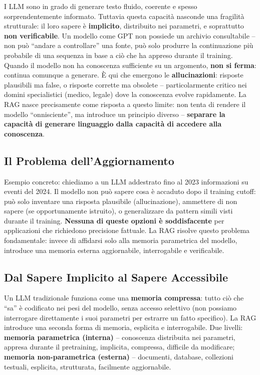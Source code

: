 \documentclass[12pt,a4paper]{article}
\begin{document}
I LLM sono in grado di generare testo fluido, coerente e spesso sorprendentemente informato. Tuttavia questa capacit\`a nasconde una fragilit\`a strutturale: il loro sapere \`e \textbf{implicito}, distribuito nei parametri, e soprattutto \textbf{non verificabile}. Un modello come GPT non possiede un archivio consultabile -- non pu\`o ``andare a controllare'' una fonte, pu\`o solo produrre la continuazione pi\`u probabile di una sequenza in base a ci\`o che ha appreso durante il training. Quando il modello non ha conoscenza sufficiente su un argomento, \textbf{non si ferma}: continua comunque a generare. \`E qui che emergono le \textbf{allucinazioni}: risposte plausibili ma false, o risposte corrette ma obsolete -- particolarmente critico nei domini specialistici (medico, legale) dove la conoscenza evolve rapidamente. La RAG nasce precisamente come risposta a questo limite: non tenta di rendere il modello ``onnisciente'', ma introduce un principio diverso -- \textbf{separare la capacit\`a di generare linguaggio dalla capacit\`a di accedere alla conoscenza}.

\subsection{Il Problema dell'Aggiornamento}

Esempio concreto: chiediamo a un LLM addestrato fino al 2023 informazioni su eventi del 2024. Il modello non pu\`o sapere cosa \`e accaduto dopo il training cutoff: pu\`o solo inventare una risposta plausibile (allucinazione), ammettere di non sapere (se opportunamente istruito), o generalizzare da pattern simili visti durante il training. \textbf{Nessuna di queste opzioni \`e soddisfacente} per applicazioni che richiedono precisione fattuale. La RAG risolve questo problema fondamentale: invece di affidarsi solo alla memoria parametrica del modello, introduce una memoria esterna aggiornabile, interrogabile e verificabile.

\subsection{Dal Sapere Implicito al Sapere Accessibile}

\begin{defbox}
Un LLM tradizionale funziona come una \textbf{memoria compressa}: tutto ci\`o che ``sa'' \`e codificato nei pesi del modello, senza accesso selettivo (non possiamo interrogare direttamente i suoi parametri per estrarre un fatto specifico). La RAG introduce una seconda forma di memoria, esplicita e interrogabile. Due livelli: \textbf{memoria parametrica (interna)} -- conoscenza distribuita nei parametri, appresa durante il pretraining, implicita, compressa, difficile da modificare; \textbf{memoria non-parametrica (esterna)} -- documenti, database, collezioni testuali, esplicita, strutturata, facilmente aggiornabile.
\end{defbox}
\end{document}
